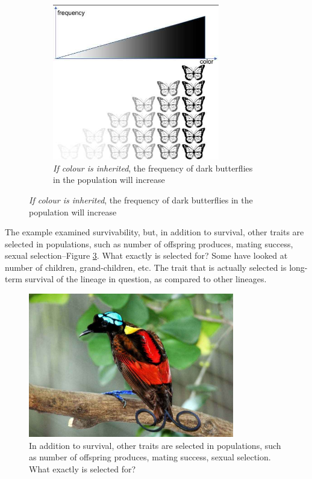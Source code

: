\documentclass[]{article}
\begin{document}
\begin{figure}[H]
\begin{subfigure}[t]{0.3\textwidth}
	\end{subfigure}
	\;\;\;
	\begin{subfigure}[t]{0.3\textwidth}
		\caption{ \emph{ If colour is inherited}, the frequency of dark butterflies in the population will increase}\label{fig:SelectionMoths2}
		\includegraphics[width=0.8\textwidth]{SelectionMoths2}
	\end{subfigure}
\end{figure}

The example examined survivability, but, in addition to survival, other traits are selected in populations, such as number of offspring produces, mating success, sexual selection--Figure \ref{fig:BrightBird}. What exactly is selected for? Some have looked at number of children, grand-children, etc. The trait that is actually selected is long-term survival of the lineage in question, as compared to other lineages.

\begin{figure}[H]
	\caption[What exactly is selected for?]{In addition to survival, other traits are selected in populations, such as number of offspring produces, mating success, sexual selection. What exactly is selected for?}\label{fig:BrightBird}
	\includegraphics[width=0.8\textwidth]{BrightBird}
\end{figure}
\end{document}
